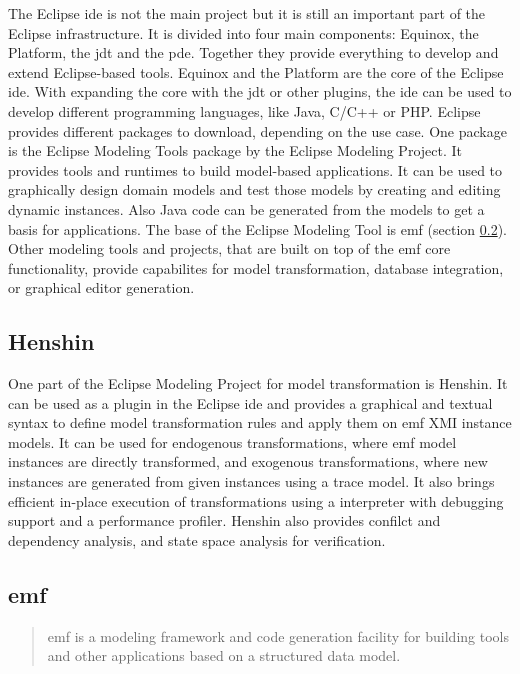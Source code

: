 \documentclass[conference,onecolumn]{IEEEtran}
\begin{document}
  The Eclipse \ac{ide} is not the main project but it is still an important part of the Eclipse infrastructure. It is divided into four main components: Equinox, the Platform, the \ac{jdt} and the \ac{pde}. Together they provide everything to develop and extend Eclipse-based tools. Equinox and the Platform are the core of the Eclipse \ac{ide}. With expanding the core with the \ac{jdt} or other plugins, the \ac{ide} can be used to develop different programming languages, like Java, C/C++ or PHP. \cite{emf} Eclipse provides different packages to download, depending on the use case. One package is the Eclipse Modeling Tools package by the Eclipse Modeling Project. It provides tools and runtimes to build model-based applications. It can be used to graphically design domain models and test those models by creating and editing dynamic instances. Also Java code can be generated from the models to get a basis for applications. \cite{eclipse_modeling} The base of the Eclipse Modeling Tool is \ac{emf} (section \ref{subsec:emf}). Other modeling tools and projects, that are built on top of the \ac{emf} core functionality, provide capabilites for model transformation, database integration, or graphical editor generation. \cite{emf}

  \subsection{Henshin}
  \label{subsec:henshin}

  One part of the Eclipse Modeling Project for model transformation is Henshin. It can be used as a plugin in the Eclipse \ac{ide} and provides a graphical and textual syntax to define model transformation rules and apply them on \ac{emf} XMI instance models. It can be used for endogenous transformations, where \ac{emf} model instances are directly transformed, and exogenous transformations, where new instances are generated from given instances using a trace model. It also brings efficient in-place execution of transformations using a interpreter with debugging support and a performance profiler. Henshin also provides confilct and dependency analysis, and state space analysis for verification. \cite{henshin-repo}

  \subsection{\acf{emf}}
  \label{subsec:emf}

  \begin{quote}
    \glqq\acf{emf} is a modeling framework and code generation facility for building tools and other applications based on a structured data model.\grqq{} \autocite{emf-repo}
  \end{quote}
\end{document}
